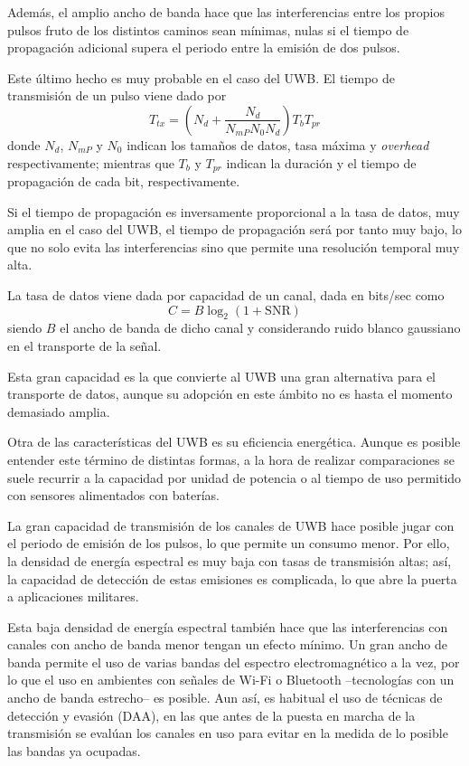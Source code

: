 Además, el amplio ancho de banda hace que las interferencias entre los propios pulsos fruto de los distintos caminos sean mínimas, nulas si el tiempo de propagación adicional supera el periodo entre la emisión de dos pulsos.

Este último hecho es muy probable en el caso del UWB.
El tiempo de transmisión de un pulso viene dado por\cite{MAIN}
\begin{equation}
    T_{tx} = \left(N_d + \frac{N_d}{N_{mP}N_{0}N_d} \right) T_b T_{pr}
\end{equation}
donde $N_d$, $N_{mP}$ y $N_{0}$ indican los tamaños de datos, tasa máxima y \textit{overhead} respectivamente;
mientras que $T_b$ y $T_{pr}$ indican la duración y el tiempo de propagación de cada bit, respectivamente.

Si el tiempo de propagación es inversamente proporcional a la tasa de datos, muy amplia en el caso del UWB, el tiempo de propagación será por tanto muy bajo, lo que no solo evita las interferencias sino que permite una resolución temporal muy alta.

La tasa de datos viene dada por capacidad de un canal, dada en bits/sec como\cite{MAIN}
\begin{equation}
    C = B\log_2(1 + \text{SNR})
\end{equation}
siendo $B$ el ancho de banda de dicho canal y considerando ruido blanco gaussiano en el transporte de la señal.

Esta gran capacidad es la que convierte al UWB una gran alternativa para el transporte de datos, aunque su adopción en este ámbito no es hasta el momento demasiado amplia.

Otra de las características del UWB es su eficiencia energética.
Aunque es posible entender este término de distintas formas, a la hora de realizar comparaciones se suele recurrir a la capacidad por unidad de potencia o al tiempo de uso permitido con sensores alimentados con baterías.

La gran capacidad de transmisión de los canales de UWB hace posible jugar con el periodo de emisión de los pulsos, lo que permite un consumo menor.
Por ello, la densidad de energía espectral es muy baja con tasas de transmisión altas; así, la capacidad de detección de estas emisiones es complicada, lo que abre la puerta a aplicaciones militares.

Esta baja densidad de energía espectral también hace que las interferencias con canales con ancho de banda menor tengan un efecto mínimo.
Un gran ancho de banda permite el uso de varias bandas del espectro electromagnético a la vez, por lo que el uso en ambientes con señales de Wi-Fi o Bluetooth --tecnologías con un ancho de banda estrecho-- es posible.
Aun así, es habitual el uso de técnicas de detección y evasión (DAA), en las que antes de la puesta en marcha de la transmisión se evalúan los canales en uso para evitar en la medida de lo posible las bandas ya ocupadas.

